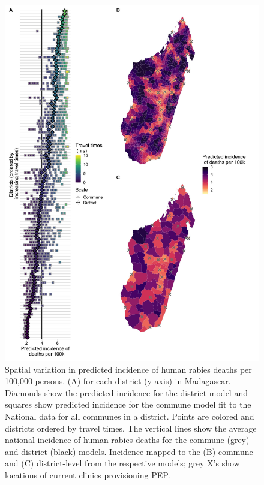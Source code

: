 \documentclass[
  oneside]{book}
\begin{document}
\begin{figure}
\includegraphics[width=0.9\linewidth]{figs/ch2/fig5} \caption[Spatial variation in predicted incidence of human rabies deaths per 100,000 persons.]{Spatial variation in predicted incidence of human rabies deaths per 100,000 persons. (A) for each district (y-axis) in Madagascar. Diamonds show the
predicted incidence for the district model and squares show predicted
incidence for the commune model fit to the National data for all
communes in a district. Points are colored and districts ordered by
travel times. The vertical lines show the average national incidence of
human rabies deaths for the commune (grey) and district (black) models.
Incidence mapped to the (B) commune- and (C) district-level from the
respective models; grey X's show locations of current clinics
provisioning PEP.}\label{fig:ch3-fig5}
\end{figure}
\end{document}
